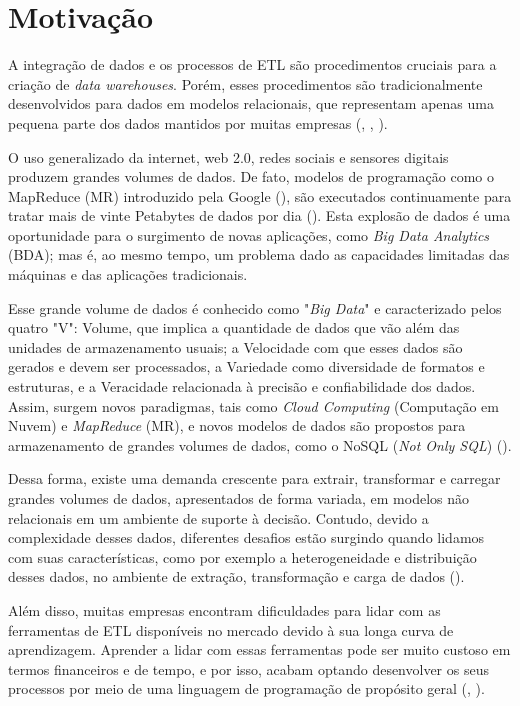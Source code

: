 \section{Motivação}

A integração de dados e os processos de ETL são procedimentos cruciais para a criação de \textit{data warehouses}. Porém, esses procedimentos são tradicionalmente desenvolvidos para dados em modelos relacionais, que representam apenas uma pequena parte dos dados mantidos por muitas empresas (\cite{darmont:2005}, \cite{russom:2007}, \cite{thomsen:2009}).

O uso generalizado da internet, web 2.0, redes sociais e sensores digitais produzem grandes volumes de dados. De fato, modelos de programação como o MapReduce (MR) introduzido pela Google (\cite{google:2004}), são executados continuamente para tratar mais de vinte Petabytes de dados por dia (\cite{dean:2008}). Esta explosão de dados é uma oportunidade para o surgimento de novas aplicações, como \textit{Big Data Analytics} (BDA); mas é, ao mesmo tempo, um problema dado as capacidades limitadas das máquinas e das aplicações tradicionais.

Esse grande volume de dados é conhecido como "\textit{Big Data}" e caracterizado pelos quatro "V": Volume, que implica a quantidade de dados que vão além das unidades de armazenamento usuais; a Velocidade com que esses dados são gerados e devem ser processados, a Variedade como diversidade de formatos e estruturas, e a Veracidade relacionada à precisão e confiabilidade dos dados. Assim, surgem novos paradigmas, tais como \textit{Cloud Computing} (Computação em Nuvem) e \textit{MapReduce} (MR), e novos modelos de dados são propostos para armazenamento de grandes volumes de dados, como o NoSQL (\textit{Not Only SQL}) (\cite{dean:2011}).

Dessa forma, existe uma demanda crescente para extrair, transformar e carregar grandes volumes de dados, apresentados de forma variada, em modelos não relacionais em um ambiente de suporte à decisão. Contudo, devido a complexidade desses dados, diferentes desafios estão surgindo quando lidamos com suas características, como por exemplo a heterogeneidade e distribuição desses dados, no ambiente de extração, transformação e carga de dados (\cite{salem:2012}).

Além disso, muitas empresas encontram dificuldades para lidar com as ferramentas de ETL disponíveis no mercado devido à sua longa curva de aprendizagem. Aprender a lidar com essas ferramentas pode ser muito custoso em termos financeiros e de tempo, e por isso, acabam optando desenvolver os seus processos por meio de uma linguagem de programação de propósito geral (\cite{awad:2011}, \cite{munoz:2009}).


